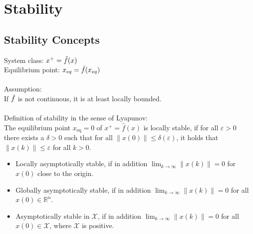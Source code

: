 \documentclass[english]{latex4ei/latex4ei_sheet}
\begin{document}
\section{Stability}
\begin{sectionbox}

\subsection{Stability Concepts}
System class: $x^{+}=\Tilde{f}(x)$\\
Equilibrium point: $x_{eq}=\Tilde{f}(x_{eq})$\\
\\
Assumption:\\
If $\Tilde{f}$ is not continuous, it is at least locally bounded.\\
\\
Definition of stability in the sense of Lyapunov:\\
The equilibrium point $x_{\mathrm{eq}}=0$ of $x^{+}=\hat{f}(x)$ is locally stable, if for all $\varepsilon>0$ there exists a $\delta>0$ such that for all $\|x(0)\| \leq \delta(\varepsilon)$, it holds that $\|x(k)\| \leq \varepsilon$ for all $k>0$.
\begin{itemize}
    \item Locally asymptotically stable, if in addition $\lim _{k \rightarrow \infty}\|x(k)\|=0$ for $x(0)$ close to the origin.
    \item Globally asymptotically stable, if in addition $\lim _{k \rightarrow \infty}\|x(k)\|=0$ for all $x(0) \in \mathbb{R}^{n}$.
    \item Asymptotically stable in $\mathcal{X}$, if in addition $\lim _{k \rightarrow \infty}\|x(k)\|=0$ for all $x(0) \in \mathcal{X}$, where $\mathcal{X}$ is positive.
\end{itemize}

\end{sectionbox}
\end{document}
